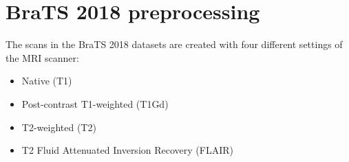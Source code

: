 \chapter{BraTS 2018 preprocessing}
The scans in the BraTS 2018 datasets are created with four different settings of the MRI scanner:

\begin{itemize}
    \item Native (T1)
    \item Post-contrast T1-weighted (T1Gd)
    \item T2-weighted (T2)
    \item T2 Fluid Attenuated Inversion Recovery (FLAIR)
\end{itemize}